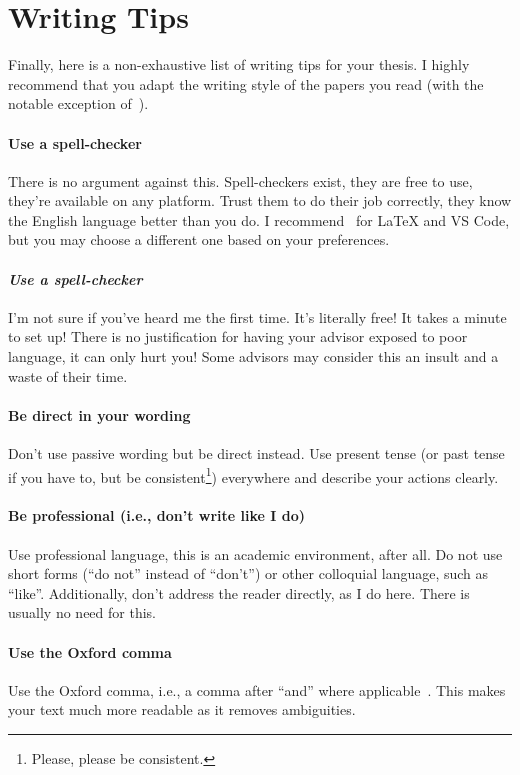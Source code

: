 \documentclass[a4]{article}
\begin{document}
\section{Writing Tips}
\label{sec:writing}

Finally, here is a non-exhaustive list of writing tips for your thesis.
I highly recommend that you adapt the writing style of the papers you read (with the notable exception of~\cite{lamport1998part}).

\paragraph{Use a spell-checker}
There is no argument against this.
Spell-checkers exist, they are free to use, they're available on any platform.
Trust them to do their job correctly, they know the English language better than you do.
I recommend~\cite{ltex} for LaTeX and VS Code, but you may choose a different one based on your preferences.

\paragraph{\textit{Use a spell-checker}}
I'm not sure if you've heard me the first time.
It's literally free!
It takes a minute to set up!
There is no justification for having your advisor exposed to poor language, it can only hurt you!
Some advisors may consider this an insult and a waste of their time.

\paragraph{Be direct in your wording}
Don't use passive wording but be direct instead.
Use present tense (or past tense if you have to, but be consistent\footnote{Please, please be consistent.}) everywhere and describe your actions clearly.

\paragraph{Be professional (i.e., don't write like I do)}
Use professional language, this is an academic environment, after all.
Do not use short forms (``do not'' instead of ``don't'') or other colloquial language, such as ``like''.
Additionally, don't address the reader directly, as I do here.
There is usually no need for this.

\paragraph{Use the Oxford comma}
Use the Oxford comma, i.e., a comma after ``and'' where applicable~\cite{oxfordcomma}.
This makes your text much more readable as it removes ambiguities.
\end{document}
